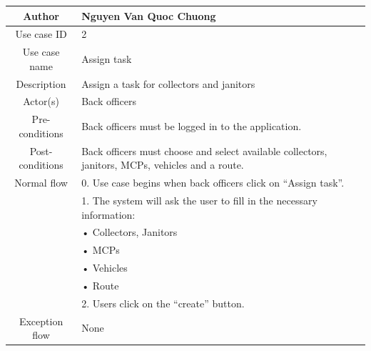 \documentclass[a4paper]{article}
\begin{document}
\begin{center}
\begin{tabular}{|c|m{35em}|}
    \hline
    Author & Nguyen Van Quoc Chuong \\
    \hline
    Use case ID & 2 \\
    \hline
    Use case name & Assign task\\
    \hline
    Description & Assign a task for collectors and janitors \\ 
    \hline
    Actor(s) & Back officers \\ 
    \hline
    Pre-conditions & Back officers must be logged in to the application. \\ 
    \hline
    Post-conditions & Back officers must choose and select available collectors, janitors, MCPs, vehicles and a route. \\ 
    \hline
    Normal flow
&0. Use case begins when back officers click on “Assign task”. \\
&1. The system will ask the user to fill in the necessary information: \\
&\hspace{0.3cm}   • Collectors, Janitors \\
&\hspace{0.3cm}   • MCPs \\
&\hspace{0.3cm}   • Vehicles \\
&\hspace{0.3cm}   • Route \\
&2. Users click on the “create” button. \\
    \hline
    Exception flow & None \\ 
    \hline
\end{tabular}
\end{center}
\end{document}
